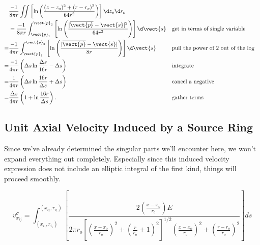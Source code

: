
\begin{align}
&\frac{-1}{8\pi r} \iint\left[ \ln\left(\frac{(z-z_o)^2 + (r-r_o)^2}{64r^2}\right)\right] \d z_o \d r_o\\
&=
    \frac{-1}{8\pi r} \int_{\vect{p}_1}^{\vect{p}_2}\left[ \ln\left(\frac{|\overline{\vect{p}}-\vect{s}|^2}{64r^2}\right)\right] \d\vect{s} && \text{get in terms of single variable}\\
=&
\frac{-1}{4\pi r} \int_{\vect{p}_1}^{\vect{p}_2}\left[ \ln\left(\frac{|\overline{\vect{p}}-\vect{s}|}{8r}\right)\right] \d\vect{s} && \text{pull the power of 2 out of the log}\\
=&
\frac{-1}{4\pi r} \left( \Delta s \ln\frac{\Delta s}{16 r} - \Delta s\right) && \text{integrate}\\
=&
\frac{1}{4\pi r} \left( \Delta s \ln\frac{16 r}{\Delta s} + \Delta s\right) && \text{cancel a negative}\\
=&
\frac{\Delta s}{4\pi r} \left( 1 + \ln\frac{16 r}{\Delta s}\right). && \text{gather terms}
\end{align}






\subsection{Unit Axial Velocity Induced by a Source Ring}%

Since we've already determined the singular parts we'll encounter here, we won't expand everything out completely. Especially since this induced velocity expression does not include an elliptic integral of the first kind, things will proceed smoothly.

$$
\begin{equation}
v_{x_{ij}}^\sigma =\int_{(x_{i_1},r_{i_1})}^{(x_{i_2},r_{i_2})}
%
\left[
\frac{2\left(\frac{x-x_o}{r_o}\right)E}{2\pi r_o \left[\left(\frac{x-x_o}{r_o}\right)^2 + \left(\frac{r}{r_o}+1\right)^2 \right]^{1/2}\left(\frac{x-x_o}{r_o}\right)^2 + \left(\frac{r-r_o}{r_o}\right)^2}
\right] ds
\end{equation}
$$

